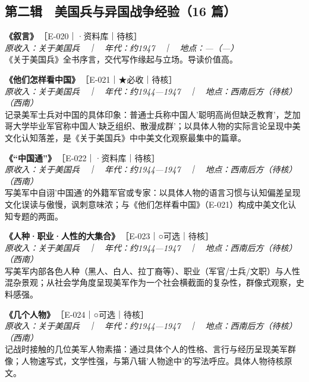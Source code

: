 \documentclass[UTF8,fontset=none,zihao=-4,a4paper]{ctexart}
\begin{document}
\subsection{第二辑　美国兵与异国战争经验（16 篇）}
\noindent\textbf{《叙言》}\,{\small ［E-020｜·资料库｜待核］}\\
{\small\itshape 原收入：关于美国兵　｜　年代：约1947　｜　地点：—（—）}\\
《关于美国兵》全书序言，交代写作缘起与立场。导读价值高。
\par\vspace{5pt}
\noindent\textbf{《他们怎样看中国》}\,{\small ［E-021｜★必收｜待核］}\\
{\small\itshape 原收入：关于美国兵　｜　年代：约1944—1947　｜　地点：西南后方（待核）（西南）}\\
记录美军士兵对中国的具体印象：普通士兵称中国人'聪明高尚但缺乏教育'，芝加哥大学毕业军官称中国人'缺乏组织、散漫成群'；以具体人物的实际言论呈现中美文化认知落差，是《关于美国兵》中中美文化观察最集中的篇章。
\par\vspace{5pt}
\noindent\textbf{《“中国通”》}\,{\small ［E-022｜·资料库｜待核］}\\
{\small\itshape 原收入：关于美国兵　｜　年代：约1944—1947　｜　地点：西南后方（待核）（西南）}\\
写美军中自诩'中国通'的外籍军官或专家：以具体人物的语言习惯与认知偏差呈现文化误读与傲慢，讽刺意味浓；与《他们怎样看中国》（E-021）构成中美文化认知专题的两面。
\par\vspace{5pt}
\noindent\textbf{《人种·职业·人性的大集合》}\,{\small ［E-023｜○可选｜待核］}\\
{\small\itshape 原收入：关于美国兵　｜　年代：约1944—1947　｜　地点：西南后方（待核）（西南）}\\
写美军内部各色人种（黑人、白人、拉丁裔等）、职业（军官/士兵/文职）与人性混杂景观；从社会学角度呈现美军作为一个社会横截面的复杂性，群像式观察，史料感强。
\par\vspace{5pt}
\noindent\textbf{《几个人物》}\,{\small ［E-024｜○可选｜待核］}\\
{\small\itshape 原收入：关于美国兵　｜　年代：约1944—1947　｜　地点：西南后方（待核）（西南）}\\
记战时接触的几位美军人物素描：通过具体个人的性格、言行与经历呈现美军群像；人物速写式，文学性强，与第八辑'人物途中'的写法呼应。具体人物待核原文。
\par\vspace{5pt}
\end{document}
